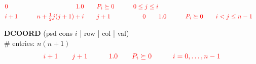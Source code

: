 \documentclass[11pt,a4paper]{article}
\theoremstyle{definition}
\begin{document}
{\[\begin{aligned}
    &{\color{red}0} \qquad &{\color{red}1.0} \qquad
    &{\color{red}P_i \succeq 0} \qquad &{\color{red}0 \leq j \leq i}\\ 
    &{\color{red}i+1} \qquad &{\color{red}n+\tfrac{1}{2}j(j+1)+i} \qquad &{\color{red}j+1} \qquad
    &{\color{red}0} \qquad &{\color{red}1.0} \qquad
    &{\color{red}P_i \succeq 0} \qquad &{\color{red}i < j \leq
      n-1 }
  \end{aligned}
\]
{\color{red}\textbf{DCOORD} (psd cons $i$ | row | col | val) \\
  \# entries: $n(n+1)$\\
  \[
    \begin{aligned}
      {\color{red} i+1} \qquad & {\color{red} j+1} \qquad & {\color{red}
        1.0} \qquad & {\color{red} P_i \succeq 0} \qquad & {\color{red} i =
        0, \dots, n-1}
    \end{aligned}
    \]

  }
}
\end{document}
